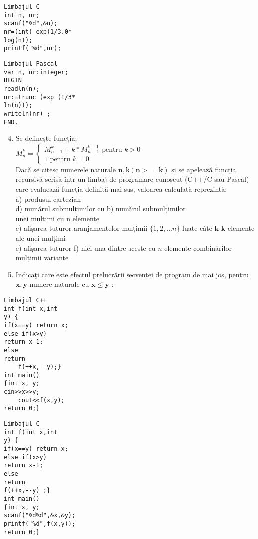 \begin{verbatim}
Limbajul C
int n, nr;
scanf("%d",&n);
nr=(int) exp(1/3.0*
log(n));
printf("%d",nr);
\end{verbatim}

\begin{verbatim}
Limbajul Pascal
var n, nr:integer;
BEGIN
readln(n);
nr:=trunc (exp (1/3*
ln(n)));
writeln(nr) ;
END.
\end{verbatim}

\begin{enumerate}
  \setcounter{enumi}{3}
  \item Se definește funcția:\\
$M_{n}^{k}=\left\{\begin{array}{c}M_{n-1}^{k}+k * M_{n-1}^{k-1} \text { pentru } k>0 \\ 1 \text { pentru } k=0\end{array}\right.$\\
Dacă se citesc numerele naturale $\mathbf{n}, \mathbf{k}(\mathbf{n}>=\mathbf{k})$ și se apelează funcția recursivă scrisă într-un limbaj de programare cunoscut (C++/C sau Pascal) care evaluează funcția definită mai sus, valoarea calculată reprezintă:\\
a) produsul cartezian\\
d) numărul submulțimilor cu b) numărul submulțimilor\\
unei mulțimi cu n elemente\\
c) afișarea tuturor aranjamentelor mulțimii $\{1,2, . . . n\}$ luate câte $\mathbf{k}$ $\mathbf{k}$ elemente ale unei mulțimi\\
e) afiṣarea tuturor f) nici una dintre aceste cu $n$ elemente combinărilor mulțimii variante
  \item Indicaţi care este efectul prelucrării secvenței de program de mai jos, pentru $\mathbf{x}, \mathbf{y}$ numere naturale cu $\mathbf{x} \leq \mathbf{y}$ :
\end{enumerate}

\begin{verbatim}
Limbajul C++
int f(int x,int
y) {
if(x==y) return x;
else if(x>y)
return x-1;
else
return
    f(++x,--y);}
int main()
{int x, y;
cin>>x>>y;
    cout<<f(x,y);
return 0;}
\end{verbatim}

\begin{verbatim}
Limbajul C
int f(int x,int
y) {
if(x==y) return x;
else if(x>y)
return x-1;
else
return
f(++x,--y) ;}
int main()
{int x, y;
scanf("%d%d",&x,&y);
printf("%d",f(x,y));
return 0;}
\end{verbatim}

